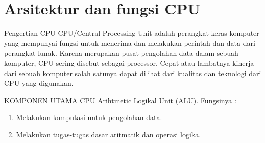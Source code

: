 \section{Arsitektur dan fungsi CPU}
Pengertian CPU 
CPU/Central Processing Unit adalah perangkat keras komputer yang mempunyai fungsi untuk menerima dan melakukan perintah dan data dari perangkat lunak. Karena merupakan pusat pengolahan data dalam sebuah komputer, CPU sering disebut sebagai processor. Cepat atau lambatnya kinerja dari sebuah komputer salah satunya dapat dilihat dari kualitas dan teknologi dari CPU yang digunakan.

KOMPONEN UTAMA CPU
Arihtmetic Logikal Unit (ALU). Fungsinya :
\begin{enumerate}
\item Melakukan komputasi untuk pengolahan data.
\item Melakukan tugas-tugas dasar aritmatik dan operasi logika.
\end{enumerate}

